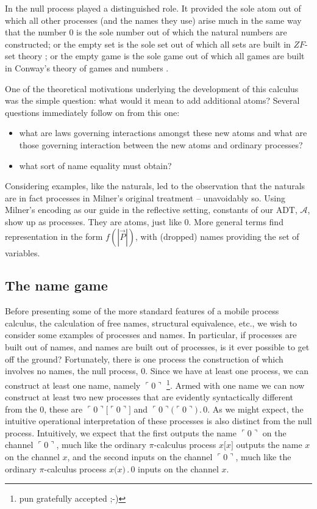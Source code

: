 \documentclass[]{entcs}
\newcommand{\lfunb}{(\!|}
\newcommand{\rfunb}{|\!)}
\newcommand{\lpquote}{\ulcorner}
\newcommand{\rpquote}{\urcorner}
\newcommand{\id}[1]{\texttt{#1}}
\newcommand{\pzero}{\mathbin{0}}
\newcommand{\concat}{\mathbin{.}}
\newcommand{\fun}[2]{#1 \lfunb #2 \rfunb}
\newcommand{\quotep}[1]{\lpquote #1 \rpquote}
\newcommand{\pic}{$\pi$-calculus}
\begin{document}
In \cite{MeredithRHO2005} the null process played a distinguished
role. It provided the sole atom out of which all other processes (and
the names they use) arise much in the same way that the number $0$ is
the sole number out of which the natural numbers are constructed; or
the empty set is the sole set out of which all sets are built in
$ZF$-set theory \cite{Krivine-TheCurryHowardCorre}; or the empty game
is the sole game out of which all games are built in Conway's theory
of games and numbers \cite{ONAG}. 

One of the theoretical motivations underlying the development of this
calculus was the simple question: what would it mean to add additional
atoms?  Several questions immediately follow on from this one:

\begin{itemize}
	\item what are laws governing interactions amongst these new atoms
	and what are those governing interaction between the new atoms and
	ordinary processes?
	\item what sort of name equality must obtain?
\end{itemize}

Considering examples, like the naturals, led to the observation that
the naturals are in fact processes in Milner's original treatment --
unavoidably so. Using Milner's encoding as our guide in the reflective
setting, constants of our ADT, $\mathcal{A}$, show up as
processes. They are atoms, just like $\pzero$. More general terms find
representation in the form $\fun{f}{\vec{P}}$, with (dropped) names
providing the set of variables.

\subsection{The name game}

Before presenting some of the more standard features of a mobile
process calculus, the calculation of free names, structural
equivalence, etc., we wish to consider some examples of processes and
names. In particular, if processes are built out of names, and names
are built out of processes, is it ever possible to get off the ground?
Fortunately, there is one process the construction of which involves
no names, the null process, $0$. Since we have at least one process,
we can construct at least one name, namely $\quotep{0}$ \footnote{pun
gratefully accepted ;-)}. Armed with one name we can now construct at
least two new processes that are evidently syntactically different
from the $0$, these are $\quotep{0}\id{[}{\quotep{0}}\id{]}$ and
$\quotep{0}\id{(}{\quotep{0}}\id{)} \concat 0$. As we might expect,
the intuitive operational interpretation of these processes is also
distinct from the null process. Intuitively, we expect that the first
outputs the name $\quotep{0}$ on the channel $\quotep{0}$, much like
the ordinary {\pic} process $x\id{[}x\id{]}$ outputs the name $x$ on
the channel $x$, and the second inputs on the channel $\quotep{0}$,
much like the ordinary {\pic} process $x\id{(}x\id{)} \concat 0$
inputs on the channel $x$.
\end{document}
